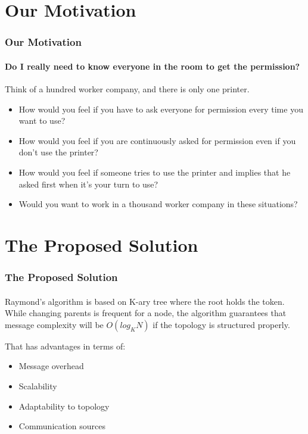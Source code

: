 \documentclass[11pt]{beamer}              %
\begin{document}
\section{Our Motivation}
\begin{frame}
\frametitle{Our Motivation}
\framesubtitle{Do I really need to know everyone in the room to get the permission?}
Think of a hundred worker company, and there is only one printer.
\begin{itemize}
    \item How would you feel if you have to ask everyone for permission every time you want to use?
    \item How would you feel if you are continuously asked for permission even if you don't use the printer?
    \item How would you feel if someone tries to use the printer and implies that he asked first when it's your turn to use?
    \item Would you want to work in a thousand worker company in these situations?
\end{itemize}
\end{frame}

\section{The Proposed Solution}
\begin{frame}
\frametitle{The Proposed Solution}
\framesubtitle{}

Raymond's algorithm is based on K-ary tree where the root holds the token. While changing parents is frequent for a node, the algorithm guarantees that message complexity will be $O(log_{K}N)$ if the topology is structured properly.

That has advantages in terms of:

\begin{itemize}
\item Message overhead
\item Scalability
\item Adaptability to topology
\item Communication sources
\end{itemize}

\end{frame}
\end{document}
